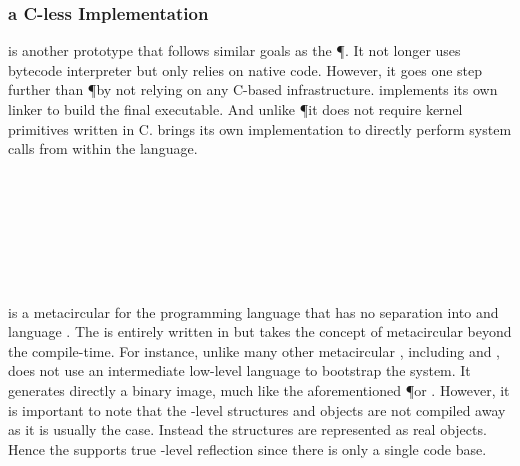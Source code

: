 \subsubsection*{\MIST a C-less \ST Implementation}
 is another prototype \ST \VM that follows similar goals as the \P \VM.
It not longer uses bytecode interpreter but only relies on native code.
However, it goes one step further than \P by not relying on any C-based infrastructure.
\MIST implements its own linker to build the final executable.
And unlike \P it does not require kernel primitives written in C.
\MIST brings its own implementation to directly perform system calls from within the language.

\subsubsection*{\DwarfPython}

\\
\\
\\
\\
\\

\subsubsection*{\Klein \VM}
 is a metacircular \VM for the \Self programming language that has no separation into \VM and language \cite{Unga05a}.
The \VM is entirely written in \Self but takes the concept of metacircular beyond the compile-time.
For instance, unlike many other metacircular \VMs, including \Cog and \Squeak, \Klein does not use an intermediate low-level language to bootstrap the system.
It generates directly a binary image, much like the aforementioned \P or \MIST \VM.
However, it is important to note that the \VM-level structures and objects are not compiled away as it is usually the case.
Instead the \VM structures are represented as real \Self objects.
Hence the \Klein \VM supports true \VM-level reflection since there is only a single code base.

